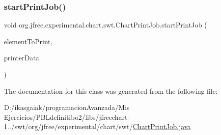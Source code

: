 \subsubsection{\texorpdfstring{start\+Print\+Job()}{startPrintJob()}}
{\footnotesize\ttfamily void org.\+jfree.\+experimental.\+chart.\+swt.\+Chart\+Print\+Job.\+start\+Print\+Job (\begin{DoxyParamCaption}\item[{Composite}]{element\+To\+Print,  }\item[{Printer\+Data}]{printer\+Data }\end{DoxyParamCaption})\hspace{0.3cm}{\ttfamily [protected]}}



The documentation for this class was generated from the following file\+:\begin{DoxyCompactItemize}
\item 
D\+:/ikasgaiak/programacion\+Avanzada/\+Mis Ejercicios/\+P\+B\+Ldefinitibo2/libs/jfreechart-\/1../swt/org/jfree/experimental/chart/swt/\mbox{\hyperlink{_chart_print_job_8java}{Chart\+Print\+Job.\+java}}\end{DoxyCompactItemize}
